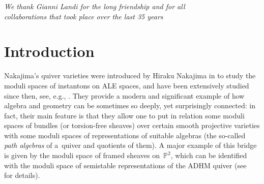 \documentclass[pdftex]{sigma}
\numberwithin{equation}{section}
\begin{document}





\begin{flushright}
\begin{minipage}{96mm}
\it We thank Gianni Landi for the long friendship and for all \\ collaborations that took place over the last 35 years
\end{minipage}
\end{flushright}

\renewcommand{\thefootnote}{\arabic{footnote}}
\setcounter{footnote}{0}

\section{Introduction}

 Nakajima's quiver varieties were introduced by Hiraku Nakajima in \cite{Naka-ALE} to study the moduli spaces of instantons on ALE spaces, and have been extensively studied since then, see, e.g., \cite{Ginz,Kuz,Nakabook,Naka-ring}. They provide a modern and significant example of how algebra and geometry can be sometimes so deeply, yet surprisingly connected: in fact, their main feature is that they allow one to put in relation some moduli spaces of bundles (or torsion-free sheaves) over certain smooth projective varieties with some moduli spaces of representations of suitable algebras (the so-called \emph{path algebras} of a~quiver and quotients of them). A major example of this bridge is given by the moduli space of framed sheaves on~$\mathbb{P}^2$, which can be identified with the moduli space of semistable representations of the ADHM quiver (see~\cite{Nakabook} for details).
\end{document}
